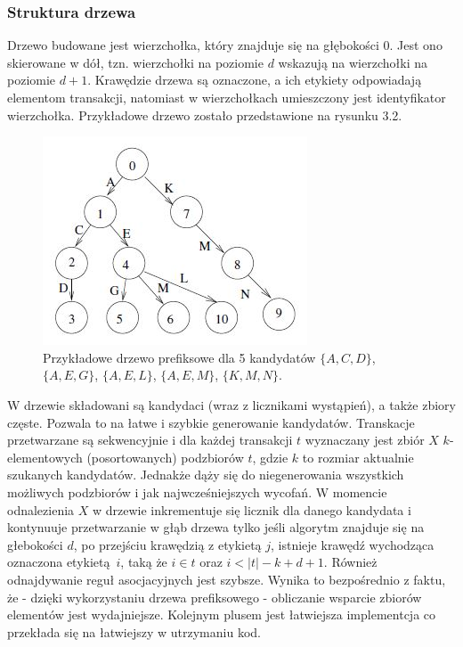 \subsubsection*{Struktura drzewa}
Drzewo budowane jest wierzchołka, który znajduje się na głębokości 0. Jest ono skierowane w dół, tzn. wierzchołki na poziomie \(d\) wskazują na wierzchołki na poziomie \(d + 1\). Krawędzie drzewa są oznaczone, a ich etykiety odpowiadają elementom transakcji, natomiast w wierzchołkach umieszczony jest identyfikator wierzchołka. Przykładowe drzewo zostało przedstawione na rysunku 3.2. 
\begin{figure}[h]
	\centering
	\includegraphics[width=0.5\linewidth]{figures/prefixTreeBodon}
	\caption[Rysunek 3.2]{Przykładowe drzewo prefiksowe dla 5 kandydatów \(\{A,C,D\}\), \(\{A,E,G\}\), \(\{A,E,L\}\), \(\{A,E,M\}\), \(\{K,M,N\}\).}
	\label{fig:prefixTreeBodon}
\end{figure}
W drzewie składowani są kandydaci (wraz z licznikami wystąpień), a także zbiory częste. Pozwala to na łatwe i szybkie generowanie kandydatów. Transkacje przetwarzane są sekwencyjnie i dla każdej transakcji \(t\) wyznaczany jest zbiór \(X\) \(k\)-elementowych (posortowanych) podzbiorów \(t\), gdzie \(k\) to rozmiar aktualnie szukanych kandydatów. Jednakże dąży się do niegenerowania wszystkich możliwych podzbiorów i jak najwcześniejszych wycofań. W momencie odnalezienia \(X\) w drzewie inkrementuje się licznik dla danego kandydata i kontynuuje przetwarzanie w głąb drzewa tylko jeśli algorytm znajduje się na głebokości \(d\), po przejściu krawędzią z etykietą \(j\), istnieje krawędź wychodząca oznaczona etykietą~\(i\), taką że \(i\in t\) oraz \(i < |t| - k + d + 1\). Również odnajdywanie reguł asocjacyjnych jest szybsze. Wynika to bezpośrednio z faktu, że - dzięki wykorzystaniu drzewa prefiksowego - obliczanie wsparcie zbiorów elementów jest wydajniejsze. Kolejnym plusem jest łatwiejsza implementcja co przekłada się na łatwiejszy w utrzymaniu kod.  


